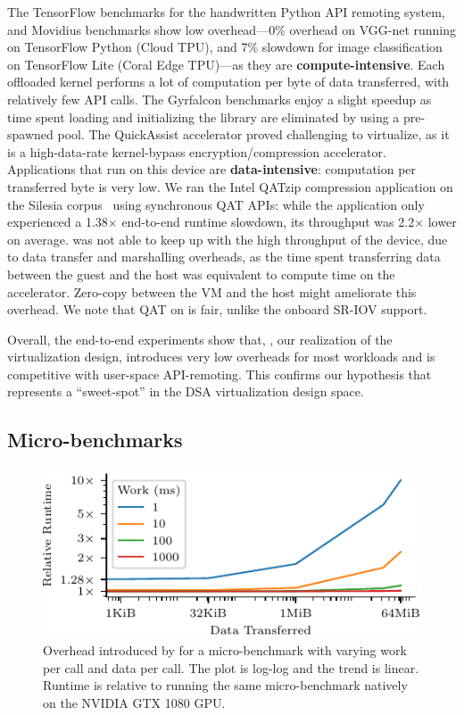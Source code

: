 The TensorFlow benchmarks for the handwritten Python API remoting system, and
Movidius benchmarks show low overhead---0\% overhead on VGG-net running on
TensorFlow Python (Cloud TPU), and 7\% slowdown for image classification on
TensorFlow Lite (Coral Edge TPU)---as they are \textbf{compute-intensive}.
Each offloaded kernel performs a lot of computation per byte of data
transferred, with relatively few API calls. The Gyrfalcon benchmarks enjoy a
slight speedup as time spent loading and initializing the library are
eliminated by using a pre-spawned \worker pool. The QuickAssist accelerator
proved challenging to virtualize, as it is a high-data-rate kernel-bypass
encryption/compression accelerator. Applications that run on this device are
\textbf{data-intensive}: computation per transferred byte is very low. We ran
the Intel QATzip compression application on the Silesia corpus~\cite{silesia}
using synchronous QAT APIs: while the application only experienced a
1.38$\times$ end-to-end runtime slowdown, its throughput was 2.2$\times$ lower
on average. \AvA was not able to keep up with the high throughput of the
device, due to data transfer and marshalling overheads, as the time spent
transferring data between the guest and the host was equivalent to compute
time on the accelerator. Zero-copy between the VM and the host might
ameliorate this overhead. We note that QAT on \AvA is fair, unlike the onboard
SR-IOV support.

Overall, the end-to-end experiments show that, \ava, our realization of the
\hira virtualization design, introduces very low overheads for most workloads
and is competitive with user-space API-remoting. This confirms our hypothesis
that \hira represents a ``sweet-spot'' in the DSA virtualization design space.

\subsection{Micro-benchmarks}
\label{s:micro_benchmark}

\begin{figure}[!!!ht!]
	\centering
	\includegraphics[width=0.7\linewidth]{ava/data/microbenchmark/overhead_plot.pdf}%
    \vspace*{-.5em}
	\caption{Overhead introduced by \AvA for a micro-benchmark with varying work per call and data per call. The plot is log-log and the trend is linear. Runtime is relative to running the same micro-benchmark natively on the NVIDIA GTX 1080 GPU.}
	\label{fig:microbenchmark_overhead}
\end{figure}

